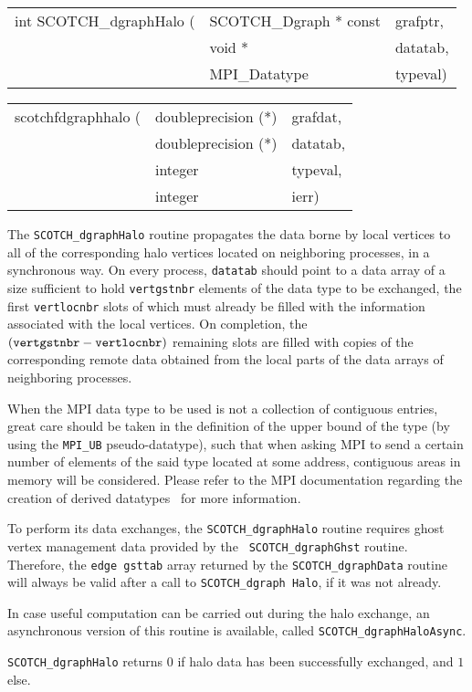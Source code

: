 \begin{itemize}
\progsyn

{\tt\begin{tabular}{l@{}ll}

int SCOTCH\_dgraphHalo ( & SCOTCH\_Dgraph * const & grafptr, \\
                         & void *                 & datatab, \\
                         & MPI\_Datatype          & typeval)
\end{tabular}}

{\tt\begin{tabular}{l@{}ll}
scotchfdgraphhalo ( & doubleprecision (*) & grafdat, \\
                    & doubleprecision (*) & datatab, \\
                    & integer             & typeval, \\
                    & integer             & ierr)
\end{tabular}}

\progdes

The {\tt SCOTCH\_dgraphHalo} routine propagates the data borne by
local vertices to all of the corresponding halo vertices located on
neighboring processes, in a synchronous way. On every process,
{\tt datatab} should point to a data array of a size sufficient to
hold {\tt vert\lbt gst\lbt nbr} elements of the data type to be
exchanged, the first {\tt vertlocnbr} slots of which must already be
filled with the information associated with the local vertices. On
completion, the $({\tt vert\lbt gst\lbt nbr} - {\tt vert\lbt loc\lbt
nbr})$ remaining slots are filled with copies of the corresponding
remote data obtained from the local parts of the data arrays of
neighboring processes.

When the MPI data type to be used is not a collection of contiguous
entries, great care should be taken in the definition of the upper
bound of the type (by using the {\tt MPI\_\lbo UB} pseudo-datatype),
such that when asking MPI to send a certain number of elements of the
said type located at some address, contiguous areas in memory will be
considered. Please refer to the MPI documentation regarding the
creation of derived datatypes~\cite[Section 3.12.3]{mpi11} for more
information.

To perform its data exchanges, the {\tt SCOTCH\_dgraph\lbt Halo}
routine requires ghost vertex management data provided by the {\tt
SCOTCH\_\lbt dgraph\lbt Ghst} routine. Therefore, the {\tt edge\lbt
gst\lbt tab} array returned by the {\tt SCOTCH\_dgraph\lbt Data}
routine will always be valid after a call to {\tt SCOTCH\_dgraph\lbt
Halo}, if it was not already.

In case useful computation can be carried out during the halo
exchange, an asynchronous version of this routine is available, called
{\tt SCOTCH\_\lbt dgraph\lbt Halo\lbt Async}.

\progret

{\tt SCOTCH\_dgraphHalo} returns $0$ if halo data has been
successfully exchanged, and $1$ else.
\end{itemize}

